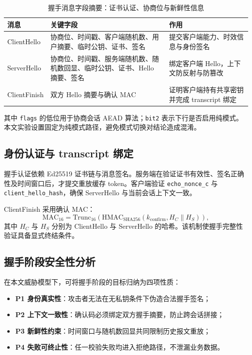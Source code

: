 \begin{table}[H]
\centering
\small
\caption{握手消息字段摘要：证书认证、协商位与新鲜性信息}
\label{tab:c3-handshake-fields}
\begin{tabular}{p{2.5cm}p{4.2cm}p{5.3cm}}
\toprule
消息 & 关键字段 & 作用 \\
\midrule
ClientHello & 协商位、时间戳、客户端随机数、用户摘要、临时公钥、证书、签名 & 提交客户端能力、时效信息与身份签名 \\
ServerHello & 协商位、时间戳、服务端随机数、随机数回显、临时公钥、证书、Hello 摘要、签名 & 绑定客户端 Hello，上下文防反射与防篡改 \\
ClientFinish & 双方 Hello 摘要与确认 MAC & 证明客户端持有共享密钥并完成 transcript 绑定 \\
\bottomrule
\end{tabular}
\end{table}

其中 \texttt{flags} 的低位用于协商会话 AEAD 算法；\texttt{bit2} 表示下行是否启用纯模式。本文实验设置固定为纯模式路径，避免模式切换对结论造成混淆。

\subsection{身份认证与 transcript 绑定}
握手认证依赖 Ed25519 证书链与消息签名。服务端在验证证书有效性、签名正确性及时间窗口后，才提交重放缓存 token。客户端验证 \texttt{echo\_nonce\_c} 与 \texttt{client\_hello\_hash}，确保 ServerHello 与当前会话上下文一致。

ClientFinish 采用确认 MAC：
\[
\mathrm{MAC}_{16}=\mathrm{Trunc}_{16}\!\left(\mathrm{HMAC}_{\mathrm{SHA256}}(k_{\mathrm{confirm}}, H_C \parallel H_S)\right),
\]
其中 $H_C$ 与 $H_S$ 分别为 ClientHello 与 ServerHello 的哈希。该机制使握手完整性验证具备显式终结条件。

\subsection{握手阶段安全性分析}
在本文威胁模型下，可将握手阶段的目标归纳为四项性质：
\begin{itemize}
  \item \textbf{P1 身份真实性}：攻击者无法在无私钥条件下伪造合法握手签名；
  \item \textbf{P2 上下文一致性}：确认码必须绑定双方握手摘要，防止跨会话拼接；
  \item \textbf{P3 新鲜性约束}：时间窗口与随机数回显共同限制历史报文重放；
  \item \textbf{P4 失败可终止性}：任一校验失败均进入拒绝路径，不泄漏业务数据。
\end{itemize}

